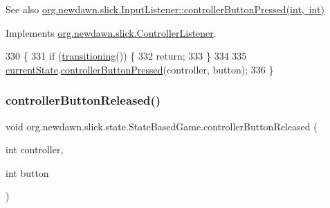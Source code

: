 \begin{DoxySeeAlso}{See also}
\mbox{\hyperlink{interfaceorg_1_1newdawn_1_1slick_1_1_controller_listener_ae6feac165a8d0eded01f38de12f239ff}{org.\+newdawn.\+slick.\+Input\+Listener\+::controller\+Button\+Pressed(int, int)}} 
\end{DoxySeeAlso}


Implements \mbox{\hyperlink{interfaceorg_1_1newdawn_1_1slick_1_1_controller_listener_ae6feac165a8d0eded01f38de12f239ff}{org.\+newdawn.\+slick.\+Controller\+Listener}}.


\begin{DoxyCode}
330                                                                     \{
331         \textcolor{keywordflow}{if} (\mbox{\hyperlink{classorg_1_1newdawn_1_1slick_1_1state_1_1_state_based_game_ae869c08778875776081935a090d4c92f}{transitioning}}()) \{
332             \textcolor{keywordflow}{return};
333         \}
334         
335         \mbox{\hyperlink{classorg_1_1newdawn_1_1slick_1_1state_1_1_state_based_game_a6a45e68094bb9b7ec30b8a8b7d415766}{currentState}}.\mbox{\hyperlink{interfaceorg_1_1newdawn_1_1slick_1_1_controller_listener_ae6feac165a8d0eded01f38de12f239ff}{controllerButtonPressed}}(controller, button);
336     \}
\end{DoxyCode}
\mbox{\label{classorg_1_1newdawn_1_1slick_1_1state_1_1_state_based_game_a83c8be949774abfd63a5837422c6f8fc}} 
\subsubsection{\texorpdfstring{controller\+Button\+Released()}{controllerButtonReleased()}}
{\footnotesize\ttfamily void org.\+newdawn.\+slick.\+state.\+State\+Based\+Game.\+controller\+Button\+Released (\begin{DoxyParamCaption}\item[{int}]{controller,  }\item[{int}]{button }\end{DoxyParamCaption})\hspace{0.3cm}{\ttfamily [inline]}}

